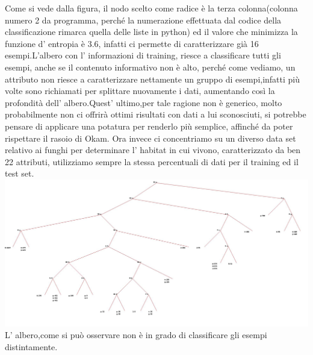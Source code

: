 		 Come si %
		  vede dalla figura, il nodo scelto come radice è la terza colonna(colonna numero 2 da programma, perché la numerazione effettuata dal codice della classificazione rimarca quella delle liste in python) ed il valore che  minimizza la funzione d' entropia è 3.6, infatti ci permette di caratterizzare già 16 esempi.L'albero con l' informazioni di training, riesce a classificare tutti gli esempi, anche se il contenuto informativo non è alto, perché come vediamo, un attributo non riesce a caratterizzare nettamente un gruppo di esempi,infatti più volte sono richiamati per splittare nuovamente i dati, aumentando così la profondità dell' albero.Quest' ultimo,per tale ragione non è generico, molto probabilmente %
		  non ci offrirà ottimi risultati con dati a lui sconosciuti, si potrebbe pensare di applicare una potatura per renderlo più semplice, affinché da poter rispettare il rasoio di Okam.
		\newline
		\newline
		Ora invece ci concentriamo su un diverso data set relativo ai funghi per determinare l' habitat in cui vivono, caratterizzato da ben 22 attributi, utilizziamo sempre la stessa percentuali di dati per il training ed il test set.
		\includegraphics[width=.9\textwidth, height=0.63\textheight]{mushroom.jpg}		
		L' albero,come si può osservare non è in grado di classificare gli esempi distintamente.
